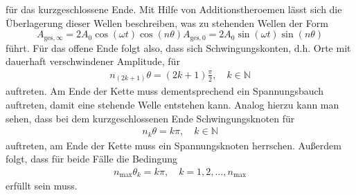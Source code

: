 für das kurzgeschlossene Ende.
Mit Hilfe von Additionstheroemen lässt sich die Überlagerung dieser Wellen beschreiben, was zu stehenden Wellen der Form
\begin{equation}
  A_{\text{ges}, \infty} = 2 A_0 \cos{(\omega t)} \cos{(n \theta)}
  A_{\text{ges}, 0} = 2 A_0 \sin{(\omega t)} \sin{(n \theta)}
\end{equation}
führt.
Für das offene Ende folgt also, dass sich Schwingungskonten, d.h. Orte mit dauerhaft verschwindener Amplitude, für
\begin{align*}
  n_{(2k+1)} \theta = (2k+1) \frac{\pi}{2}, \quad k \in \mathbb{N}
\end{align*}
auftreten.
Am Ende der Kette muss dementsprechend ein Spannungsbauch auftreten, damit eine stehende Welle entstehen kann.
Analog hierzu kann man sehen, dass bei dem kurzgeschlossenen Ende Schwingungsknoten für
\begin{align*}
  n_{k} \theta = k \pi, \quad k \in \mathbb{N}
\end{align*}
auftreten, am Ende der Kette muss ein Spannungsknoten herrschen.
Außerdem folgt, dass für beide Fälle die Bedingung
\begin{align*}
  n_{\text{max}} \theta_k = k \pi, \quad k = 1, 2, \ldots, n_{\text{max}}
\end{align*}
erfüllt sein muss.
